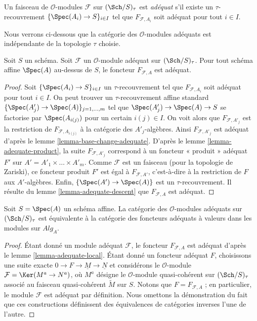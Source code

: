 \begin{definition}
\label{definition-adequate}
Un faisceau de $\mathcal{O}$-modules $\mathcal{F}$ sur $(\Sch/S)_\tau$ est
{\it adéquat} s'il existe un $\tau$-recouvrement
$\{\Spec(A_i) \to S\}_{i \in I}$ tel que $F_{\mathcal{F}, A_i}$ soit
adéquat pour tout $i \in I$.
\end{definition}

\noindent
Nous verrons ci-dessous que la catégorie des $\mathcal{O}$-modules adéquats
est indépendante de la topologie $\tau$ choisie.

\begin{lemma}
\label{lemma-adequate-local}
Soit $S$ un schéma. Soit $\mathcal{F}$ un $\mathcal{O}$-module adéquat sur
$(\Sch/S)_\tau$. Pour tout schéma affine $\Spec(A)$ au-dessus de $S$,
le foncteur $F_{\mathcal{F}, A}$ est adéquat.
\end{lemma}

\begin{proof}
Soit $\{\Spec(A_i) \to S\}_{i \in I}$ un $\tau$-recouvrement
tel que $F_{\mathcal{F}, A_i}$ soit adéquat pour tout $i \in I$.
On peut trouver un $\tau$-recouvrement affine standard
$\{\Spec(A'_j) \to \Spec(A)\}_{j = 1, \ldots, m}$
tel que $\Spec(A'_j) \to \Spec(A) \to S$ se factorise
par $\Spec(A_{i(j)})$ pour un certain $i(j) \in I$. On voit alors que
$F_{\mathcal{F}, A'_j}$ est la restriction de
$F_{\mathcal{F}, A_{i(j)}}$ à la catégorie des $A'_j$-algèbres.
Ainsi $F_{\mathcal{F}, A'_j}$ est adéquat d'après le
lemme \ref{lemma-base-change-adequate}.
D'après le
lemme \ref{lemma-adequate-product},
la suite
$F_{\mathcal{F}, A'_j}$ correspond à un foncteur « produit » adéquat
$F'$ sur $A' = A'_1 \times \ldots \times A'_m$. Comme $\mathcal{F}$ est un
faisceau (pour la topologie de Zariski), ce foncteur produit $F'$ est égal
à $F_{\mathcal{F}, A'}$, c'est-à-dire à la restriction de $F$ aux $A'$-algèbres.
Enfin, $\{\Spec(A') \to \Spec(A)\}$ est un $\tau$-recouvrement.
Il résulte du
lemme \ref{lemma-adequate-descent}
que $F_{\mathcal{F}, A}$ est adéquat.
\end{proof}

\begin{lemma}
\label{lemma-adequate-affine}
Soit $S = \Spec(A)$ un schéma affine. La catégorie des
$\mathcal{O}$-modules adéquats sur $(\Sch/S)_\tau$ est équivalente à la
catégorie des foncteurs adéquats à valeurs dans les modules sur $\textit{Alg}_A$.
\end{lemma}

\begin{proof}
Étant donné un module adéquat $\mathcal{F}$, le foncteur $F_{\mathcal{F}, A}$
est adéquat d'après le lemme \ref{lemma-adequate-local}.
Étant donné un foncteur adéquat $F$, choisissons une suite exacte
$0 \to F \to \underline{M} \to \underline{N}$ et considérons
le $\mathcal{O}$-module $\mathcal{F} = \Ker(M^a \to N^a)$, où
$M^a$ désigne le $\mathcal{O}$-module quasi-cohérent sur
$(\Sch/S)_\tau$ associé au faisceau quasi-cohérent
$\widetilde{M}$ sur $S$. Notons que $F = F_{\mathcal{F}, A}$ ; en particulier,
le module $\mathcal{F}$ est adéquat par définition.
Nous omettons la démonstration du fait que ces constructions définissent des équivalences
de catégories inverses l'une de l'autre.
\end{proof}

